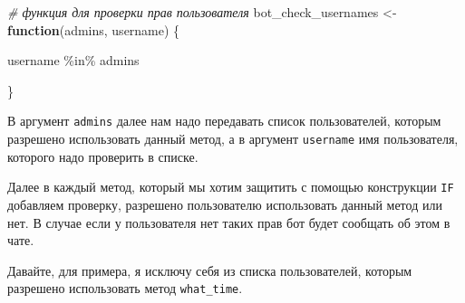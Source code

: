 \documentclass[
]{book}
\newenvironment{Shaded}{\begin{snugshade}}{\end{snugshade}}
\newcommand{\CommentTok}[1]{\textcolor[rgb]{0.56,0.35,0.01}{\textit{#1}}}
\newcommand{\ControlFlowTok}[1]{\textcolor[rgb]{0.13,0.29,0.53}{\textbf{#1}}}
\newcommand{\NormalTok}[1]{#1}
\newcommand{\OtherTok}[1]{\textcolor[rgb]{0.56,0.35,0.01}{#1}}
\newcommand{\SpecialCharTok}[1]{\textcolor[rgb]{0.00,0.00,0.00}{#1}}
\begin{document}
\begin{Shaded}
\begin{Highlighting}[]
\CommentTok{\# функция для проверки прав пользователя}
\NormalTok{bot\_check\_usernames }\OtherTok{\textless{}{-}} 
  \ControlFlowTok{function}\NormalTok{(admins, username) \{}
  
\NormalTok{   username }\SpecialCharTok{\%in\%}\NormalTok{ admins }
  
\NormalTok{\}}
\end{Highlighting}
\end{Shaded}

В аргумент \texttt{admins} далее нам надо передавать список пользователей, которым разрешено использовать данный метод, а в аргумент \texttt{username} имя пользователя, которого надо проверить в списке.

Далее в каждый метод, который мы хотим защитить с помощью конструкции \texttt{IF} добавляем проверку, разрешено пользователю использовать данный метод или нет. В случае если у пользователя нет таких прав бот будет сообщать об этом в чате.

Давайте, для примера, я исключу себя из списка пользователей, которым разрешено использовать метод \texttt{what\_time}.
\end{document}
